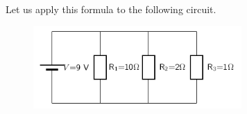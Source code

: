           \label{m38776*id66324}Let us apply this formula to the following circuit.\par 
          \label{m38776*id66328}
            
    \setcounter{subfigure}{0}


	\begin{figure}[H] %
    \begin{center}
    \label{m38776*id66331!!!underscore!!!media}\label{m38776*id66331!!!underscore!!!printimage}\includegraphics[width=300px]{col11305.imgs/m38776_PG11C9_010.png} %
        
      \vspace{2pt}
    \vspace{.1in}
    
    \end{center}

 \end{figure}   

    \addtocounter{footnote}{-0}
    

